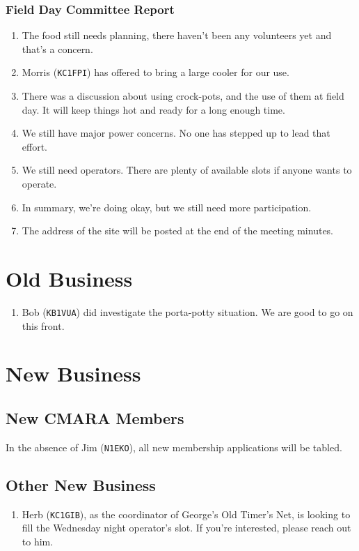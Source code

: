 \documentclass[10pt,letterpaper]{article}
\begin{document}
\subsubsection{Field Day Committee Report}
\begin{enumerate}
  \item The food still needs planning, there haven't been any volunteers yet and that's a concern.
  \item Morris (\texttt{KC1FPI}) has offered to bring a large cooler for our use.
  \item There was a discussion about using crock-pots, and the use of them at field day. It will keep things hot and ready for a long enough time.
  \item We still have major power concerns. No one has stepped up to lead that effort.
  \item We still need operators. There are plenty of available slots if anyone wants to operate.
  \item In summary, we're doing okay, but we still need more participation.
  \item The address of the site will be posted at the end of the meeting minutes.
\end{enumerate}

\section{Old Business}
\begin{enumerate}
  \item Bob (\texttt{KB1VUA}) did investigate the porta-potty situation. We are good to go on this front.
\end{enumerate}

\section{New Business}

\subsection{New CMARA Members}
\label{new-cmara-members}

In the absence of Jim (\texttt{N1EKO}), all new membership applications will be tabled.

\subsection{Other New Business}
\begin{enumerate}
  \item Herb (\texttt{KC1GIB}), as the coordinator of George's Old Timer's Net, is looking to fill the Wednesday night operator's slot. If you're interested, please reach out to him.
\end{enumerate}
\end{document}
